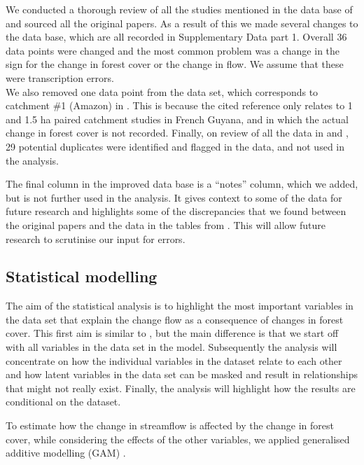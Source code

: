 \documentclass[]{elsarticle} %
\begin{document}
We conducted a thorough review of all the studies mentioned in the data base of \citet{zhang2015} and sourced all the original papers. As a result of this we made several changes to the data base, which are all recorded in Supplementary Data part 1. Overall 36 data points were changed and the most common problem was a change in the sign for the change in forest cover or the change in flow. We assume that these were transcription errors.\\
We also removed one data point from the data set, which corresponds to catchment \#1 (Amazon) in \citet{zhang2017}. This is because the cited reference \citep{roche1981} only relates to 1 and 1.5 ha paired catchment studies in French Guyana, and in which the actual change in forest cover is not recorded. Finally, on review of all the data in \citet{zhang2017} and \citet{filoso2017}, 29 potential duplicates were identified and flagged in the data, and not used in the analysis.

The final column in the improved data base is a ``notes'' column, which we added, but is not further used in the analysis. It gives context to some of the data for future research and highlights some of the discrepancies that we found between the original papers and the data in the tables from \citet{zhang2017}. This will allow future research to scrutinise our input for errors.

\hypertarget{statistical-modelling}{%
\subsection{Statistical modelling}\label{statistical-modelling}}

The aim of the statistical analysis is to highlight the most important variables in the data set that explain the change flow as a consequence of changes in forest cover. This first aim is similar to \citet{zhang2017}, but the main difference is that we start off with all variables in the data set in the model. Subsequently the analysis will concentrate on how the individual variables in the dataset relate to each other and how latent variables in the data set can be masked and result in relationships that might not really exist. Finally, the analysis will highlight how the results are conditional on the dataset.

To estimate how the change in streamflow is affected by the change in forest cover, while considering the effects of the other variables, we applied generalised additive modelling (GAM) \citep{wood2006}.
\end{document}
